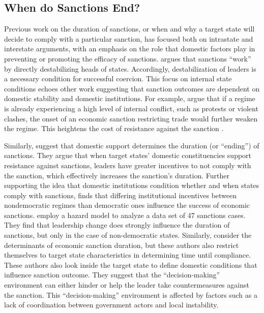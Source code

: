\subsection*{When do Sanctions End?}
\label{lit}

Previous work on the duration of sanctions, or when and why a target state will decide to comply with a particular sanction, has focused both on intrastate and interstate arguments, with an emphasis on the role that domestic factors play in preventing or promoting the efficacy of sanctions. \cite{marinov2005} argues that sanctions ``work'' by directly destabilizing heads of states. Accordingly, destabilization of leaders is a necessary condition for successful coercion.  This focus on internal state conditions echoes other work suggesting that sanction outcomes are dependent on domestic stability and domestic institutions. For example, {\cite{dashti1997}} argue that if a regime is already experiencing a high level of internal conflict, such as protests or violent clashes, the onset of an economic sanction restricting trade would further weaken the regime. This heightens the cost of resistance against the sanction \citep{dashti1997}. 

Similarly, \cite{dorussen2001} suggest that domestic support determines the duration (or ``ending'') of sanctions. They argue that when target states' domestic constituencies support resistance against sanctions, leaders have greater incentives to not comply with the sanction, which effectively increases the sanction's duration. Further supporting the idea that domestic institutions condition whether and when states comply with sanctions, \cite{lektzian2007} finds that differing institutional incentives between nondemocratic regimes than democratic ones influence the success of economic sanctions. \cite{mcgillivray2004} employ a hazard model to analyze a data set of 47 sanctions cases. They find that leadership change does strongly influence the duration of sanctions, but only in the case of non-democratic states. Similarly, \cite{bolks2000} consider the determinants of economic sanction duration, but these authors also restrict themselves to target state characteristics in determining time until compliance. These authors also look inside the target state to define domestic conditions that influence sanction outcome. They suggest that the ``decision-making'' environment can either hinder or help the leader take countermeasures against the sanction. This ``decision-making'' environment is affected by factors such as a lack of coordination between government actors and local instability. 


